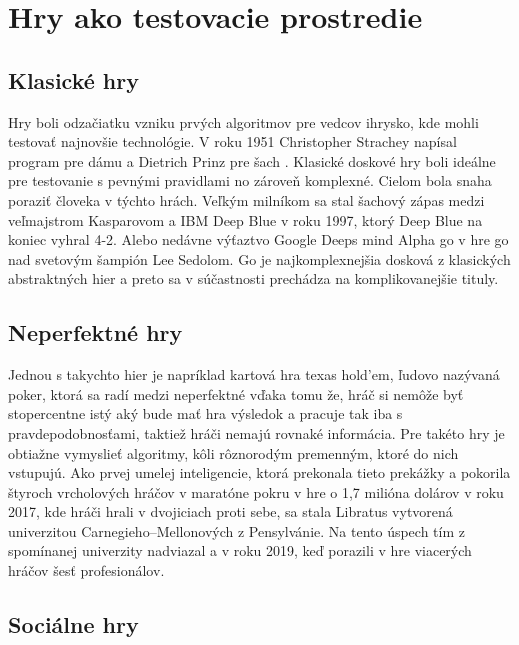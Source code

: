 \documentclass{article}
\begin{document}
\clearpage

\section{Hry ako testovacie prostredie}
\subsection{Klasické hry}

Hry boli odzačiatku vzniku prvých algoritmov pre vedcov ihrysko, kde mohli testovať najnovšie technológie. V roku 1951 Christopher Strachey  napísal program pre dámu a Dietrich Prinz pre šach \cite{Copeland}. Klasické doskové hry boli ideálne pre testovanie s pevnými pravidlami no zároveň komplexné. Cielom bola snaha poraziť človeka v týchto hrách. Veľkým milníkom sa stal šachový zápas medzi veľmajstrom Kasparovom a IBM Deep Blue v roku 1997, ktorý Deep Blue na koniec vyhral 4-2. Alebo nedávne výťaztvo Google Deeps mind Alpha go v hre go nad svetovým šampión Lee Sedolom\cite{Reuters}. Go je najkomplexnejšia dosková z klasických abstraktných hier a preto sa v súčastnosti prechádza na komplikovanejšie tituly.

\subsection{Neperfektné hry}

Jednou s takychto hier je napríklad kartová hra texas hold'em, ľudovo nazývaná poker, ktorá sa radí medzi neperfektné vďaka tomu že, hráč si nemôže byť stopercentne istý aký bude mať hra výsledok a pracuje tak iba s pravdepodobnosťami, taktiež hráči nemajú rovnaké informácia. Pre takéto hry je obtiažne vymyslieť algoritmy, kôli rôznorodým premenným, ktoré do nich vstupujú. Ako prvej umelej inteligencie, ktorá prekonala tieto prekážky a pokorila štyroch vrcholových hráčov v maratóne pokru v hre o 1,7 milióna dolárov v roku 2017, kde hráči hrali v dvojiciach proti sebe, sa stala Libratus vytvorená univerzitou Carnegieho–Mellonových z Pensylvánie\cite{Reuters}. Na tento úspech tím z spomínanej univerzity nadviazal a v roku 2019, keď porazili v hre viacerých hráčov šesť profesionálov\cite{Nature}. 

\subsection{Sociálne hry}
\end{document}
